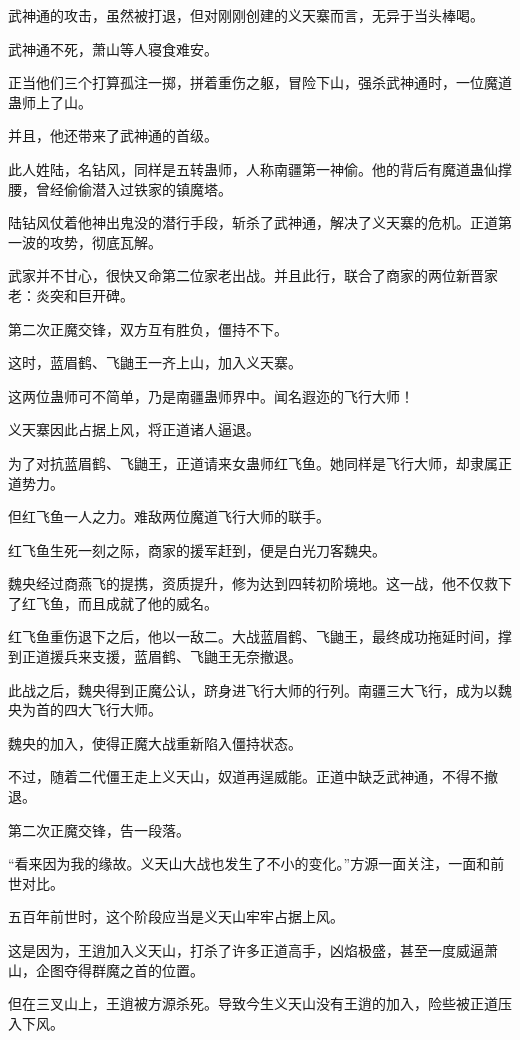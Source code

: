 \begin{this_body}
武神通的攻击，虽然被打退，但对刚刚创建的义天寨而言，无异于当头棒喝。

武神通不死，萧山等人寝食难安。

正当他们三个打算孤注一掷，拼着重伤之躯，冒险下山，强杀武神通时，一位魔道蛊师上了山。

并且，他还带来了武神通的首级。

此人姓陆，名钻风，同样是五转蛊师，人称南疆第一神偷。他的背后有魔道蛊仙撑腰，曾经偷偷潜入过铁家的镇魔塔。

陆钻风仗着他神出鬼没的潜行手段，斩杀了武神通，解决了义天寨的危机。正道第一波的攻势，彻底瓦解。

武家并不甘心，很快又命第二位家老出战。并且此行，联合了商家的两位新晋家老：炎突和巨开碑。

第二次正魔交锋，双方互有胜负，僵持不下。

这时，蓝眉鹤、飞鼬王一齐上山，加入义天寨。

这两位蛊师可不简单，乃是南疆蛊师界中。闻名遐迩的飞行大师！

义天寨因此占据上风，将正道诸人逼退。

为了对抗蓝眉鹤、飞鼬王，正道请来女蛊师红飞鱼。她同样是飞行大师，却隶属正道势力。

但红飞鱼一人之力。难敌两位魔道飞行大师的联手。

红飞鱼生死一刻之际，商家的援军赶到，便是白光刀客魏央。

魏央经过商燕飞的提携，资质提升，修为达到四转初阶境地。这一战，他不仅救下了红飞鱼，而且成就了他的威名。

红飞鱼重伤退下之后，他以一敌二。大战蓝眉鹤、飞鼬王，最终成功拖延时间，撑到正道援兵来支援，蓝眉鹤、飞鼬王无奈撤退。

此战之后，魏央得到正魔公认，跻身进飞行大师的行列。南疆三大飞行，成为以魏央为首的四大飞行大师。

魏央的加入，使得正魔大战重新陷入僵持状态。

不过，随着二代僵王走上义天山，奴道再逞威能。正道中缺乏武神通，不得不撤退。

第二次正魔交锋，告一段落。

“看来因为我的缘故。义天山大战也发生了不小的变化。”方源一面关注，一面和前世对比。

五百年前世时，这个阶段应当是义天山牢牢占据上风。

这是因为，王逍加入义天山，打杀了许多正道高手，凶焰极盛，甚至一度威逼萧山，企图夺得群魔之首的位置。

但在三叉山上，王逍被方源杀死。导致今生义天山没有王逍的加入，险些被正道压入下风。


\end{this_body}
